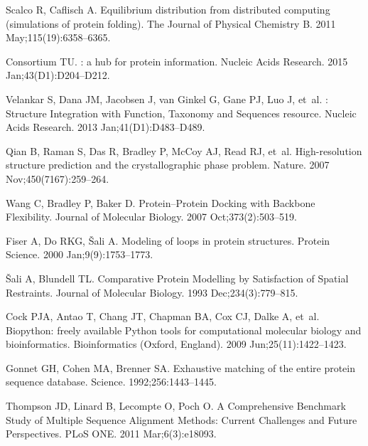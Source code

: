 \documentclass[10pt,letterpaper]{article}
\begin{document}
\begin{thebibliography}{100}
Scalco R, Caflisch A.
\newblock Equilibrium distribution from distributed computing (simulations of
  protein folding).
\newblock The Journal of Physical Chemistry B. 2011 May;115(19):6358--6365.

Consortium TU.
: a hub for protein information.
\newblock Nucleic Acids Research. 2015 Jan;43(D1):D204--D212.

Velankar S, Dana JM, Jacobsen J, van Ginkel G, Gane PJ, Luo J, et~al.
: {Structure} {Integration} with {Function}, {Taxonomy} and
  {Sequences} resource.
\newblock Nucleic Acids Research. 2013 Jan;41(D1):D483--D489.

Qian B, Raman S, Das R, Bradley P, McCoy AJ, Read RJ, et~al.
\newblock High-resolution structure prediction and the crystallographic phase
  problem.
\newblock Nature. 2007 Nov;450(7167):259--264.

Wang C, Bradley P, Baker D.
\newblock Protein–{Protein} {Docking} with {Backbone} {Flexibility}.
\newblock Journal of Molecular Biology. 2007 Oct;373(2):503--519.

Fiser A, Do RKG, {\v{S}ali} A.
\newblock Modeling of loops in protein structures.
\newblock Protein Science. 2000 Jan;9(9):1753--1773.

{\v{S}ali} A, Blundell TL.
\newblock Comparative {Protein} {Modelling} by {Satisfaction} of {Spatial}
  {Restraints}.
\newblock Journal of Molecular Biology. 1993 Dec;234(3):779--815.

Cock PJA, Antao T, Chang JT, Chapman BA, Cox CJ, Dalke A, et~al.
\newblock Biopython: freely available {Python} tools for computational
  molecular biology and bioinformatics.
\newblock Bioinformatics (Oxford, England). 2009 Jun;25(11):1422--1423.

Gonnet GH, Cohen MA, Brenner SA.
\newblock Exhaustive matching of the entire protein sequence database.
\newblock Science. 1992;256:1443--1445.

Thompson JD, Linard B, Lecompte O, Poch O.
\newblock A {Comprehensive} {Benchmark} {Study} of {Multiple} {Sequence}
  {Alignment} {Methods}: {Current} {Challenges} and {Future} {Perspectives}.
\newblock PLoS ONE. 2011 Mar;6(3):e18093.


\end{thebibliography}
\end{document}
